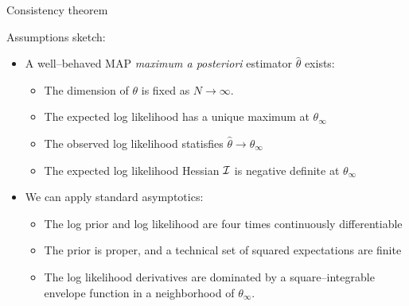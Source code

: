 

    

\begin{frame}[t]{Consistency theorem}

    
\def\thetatrue{\theta_{\infty}}
\def\thetahat{\hat\theta}


\def\normdist{\mathcal{N}}

\def\gcovtrue{V^g}

Assumptions sketch:
%
\begin{itemize}
    \item A well--behaved MAP \textit{maximum a posteriori} estimator $\thetahat$ exists:
    \begin{itemize}
        \item The dimension of $\theta$ is fixed as $N \rightarrow \infty$.
        \item The expected log likelihood has a unique maximum at $\thetatrue$
        \item The observed log likelihood statisfies $\thetahat \rightarrow \thetatrue$
        \item The expected log likelihood Hessian $\mathcal{I}$ is negative definite at $\thetatrue$ 
    \end{itemize}
    \item We can apply standard asymptotics:
    \begin{itemize}
    \item The log prior and log likelihood are four times continuously differentiable
    \item The prior is proper, and a technical set of squared expectations are finite
    \item The log likelihood derivatives are dominated by a square--integrable envelope function in a
          neighborhood of $\theta_\infty$.
    \end{itemize}
\end{itemize}
%
\pause


\end{frame}
